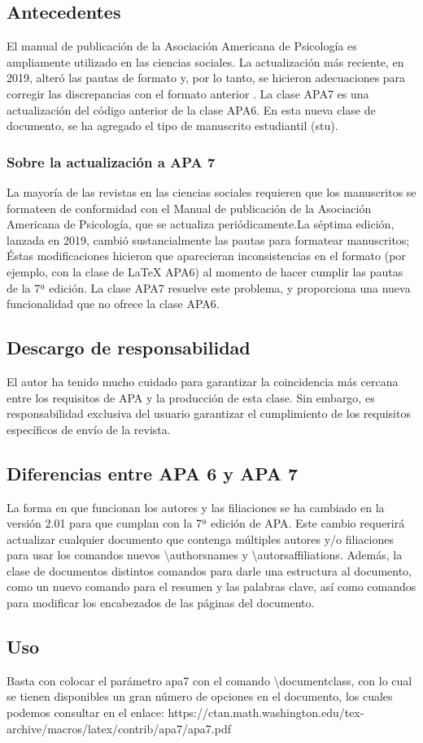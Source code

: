 \documentclass[12pt,letterpaper,jou]{apa7} %
\begin{document}
\subsection{Antecedentes}

El manual de publicación de la Asociación Americana de Psicología es ampliamente utilizado en las ciencias sociales. La actualización más reciente, en 2019, alteró las pautas de formato y, por lo tanto, se hicieron adecuaciones para corregir las discrepancias con el formato anterior . La clase APA7 es una actualización del código anterior de la clase APA6. En esta nueva clase de documento, se ha agregado el tipo de manuscrito estudiantil (stu).

\subsubsection{Sobre la actualización a APA 7}

La mayoría de las revistas en las ciencias sociales requieren que los manuscritos se formateen de conformidad con el Manual de publicación de la Asociación Americana de Psicología, que se actualiza periódicamente.La séptima edición, lanzada en 2019, cambió sustancialmente las pautas para formatear manuscritos; Éstas modificaciones hicieron que aparecieran inconsistencias en el formato (por ejemplo, con la clase de LaTeX APA6) al momento de hacer cumplir las pautas de la 7ª edición. La clase APA7 resuelve este problema, y
proporciona una nueva funcionalidad que no ofrece la clase APA6.

\subsection{Descargo de responsabilidad}

El autor ha tenido mucho cuidado para garantizar la coincidencia más cercana entre los requisitos de APA y la producción de esta clase. Sin embargo, es responsabilidad exclusiva del usuario garantizar el cumplimiento de los requisitos específicos de envío de la revista.

\subsection{Diferencias entre APA 6 y APA 7}

La forma en que funcionan los autores y las filiaciones se ha cambiado en la versión 2.01 para que cumplan con la 7ª edición de APA. Este cambio requerirá actualizar cualquier documento que contenga múltiples autores y/o filiaciones para usar los comandos nuevos \textbackslash authorsnames y \textbackslash autorsaffiliations. Además, la clase de documentos distintos comandos para darle una estructura al documento, como un nuevo comando para el resumen y las palabras clave, así como comandos para modificar los encabezados de las páginas del documento.

\subsection{Uso}

Basta con colocar el parámetro apa7 con el comando \textbackslash documentclass, con lo cual se tienen disponibles un gran número de opciones en el documento, los cuales podemos consultar en el enlace: https://ctan.math.washington.edu/tex-archive/macros/latex/contrib/apa7/apa7.pdf
\end{document}
